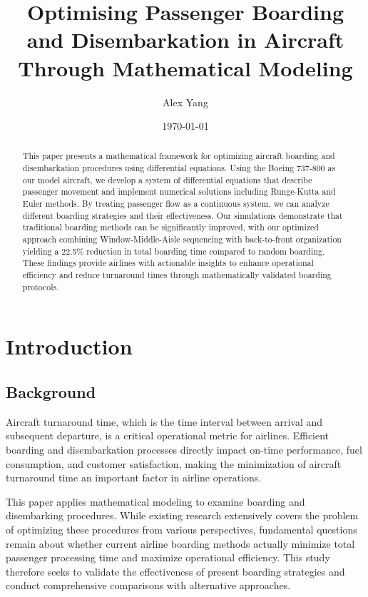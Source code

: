 \documentclass[a4paper,12pt]{article}
\title{Optimising Passenger Boarding and Disembarkation in Aircraft Through Mathematical Modeling}
\author{Alex Yang}
\date{\today}
\begin{document}
\maketitle

\begin{abstract}
This paper presents a mathematical framework for optimizing aircraft boarding and disembarkation procedures using differential equations. Using the Boeing 737-800 as our model aircraft, we develop a system of differential equations that describe passenger movement and implement numerical solutions including Runge-Kutta and Euler methods. By treating passenger flow as a continuous system, we can analyze different boarding strategies and their effectiveness. Our simulations demonstrate that traditional boarding methods can be significantly improved, with our optimized approach combining Window-Middle-Aisle sequencing with back-to-front organization yielding a 22.5\% reduction in total boarding time compared to random boarding. These findings provide airlines with actionable insights to enhance operational efficiency and reduce turnaround times through mathematically validated boarding protocols.
\end{abstract}

\section{Introduction}

\subsection{Background}

Aircraft turnaround time, which is the time interval between arrival and subsequent departure, is a critical operational metric for airlines. Efficient boarding and disembarkation processes directly impact on-time performance, fuel consumption, and customer satisfaction, making the minimization of aircraft turnaround time an important factor in airline operations.

This paper applies mathematical modeling to examine boarding and disembarking procedures. While existing research extensively covers the problem of optimizing these procedures from various perspectives, fundamental questions remain about whether current airline boarding methods actually minimize total passenger processing time and maximize operational efficiency. This study therefore seeks to validate the effectiveness of present boarding strategies and conduct comprehensive comparisons with alternative approaches.
\end{document}
